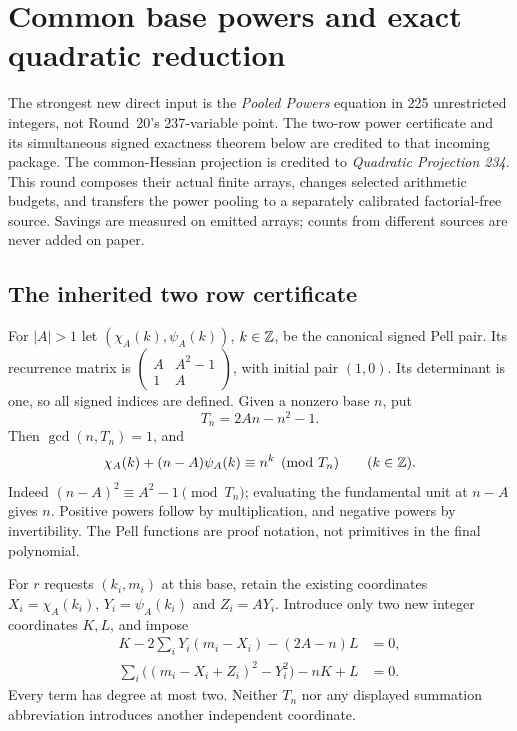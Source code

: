 \section{Common base powers and exact quadratic reduction}
\label{sec:signed}
The strongest new direct input is the \emph{Pooled Powers} equation in
225 unrestricted integers, not Round~20's 237-variable point. The two-row
power certificate and its simultaneous signed exactness theorem below
are credited to that incoming package. The common-Hessian projection
is credited to \emph{Quadratic Projection 234}. This round composes their
actual finite arrays, changes selected arithmetic budgets, and transfers
the power pooling to a separately calibrated factorial-free source.
Savings are measured on emitted arrays; counts from different sources
are never added on paper.

\subsection{The inherited two row certificate}
For $|A|>1$ let $(\chi_A(k),\psi_A(k))$, $k\in\mathbb Z$, be the canonical
signed Pell pair. Its recurrence matrix is
$\left(\begin{smallmatrix}A&A^2-1\\1&A\end{smallmatrix}\right)$,
with initial pair $(1,0)$. Its determinant is one, so all signed indices
are defined. Given a nonzero base $n$, put
\[
 T_n=2An-n^2-1.
\]
Then $\gcd(n,T_n)=1$, and
\begin{equation}\label{eq:pooled-congruence}
 \chi_A(k)+(n-A)\psi_A(k)\equiv n^k\pmod{T_n}
 \qquad(k\in\mathbb Z).
\end{equation}
Indeed $(n-A)^2\equiv A^2-1\pmod{T_n}$; evaluating the fundamental
unit at $n-A$ gives $n$. Positive powers follow by multiplication,
and negative powers by invertibility. The Pell functions are proof
notation, not primitives in the final polynomial.

For $r$ requests $(k_i,m_i)$ at this base, retain the existing coordinates
$X_i=\chi_A(k_i)$, $Y_i=\psi_A(k_i)$ and $Z_i=AY_i$.
Introduce only two new integer coordinates $K,L$, and impose
\begin{align}
 K-2\sum_iY_i(m_i-X_i)-(2A-n)L&=0,\label{eq:pool-row1}\\
 \sum_i\bigl((m_i-X_i+Z_i)^2-Y_i^2\bigr)-nK+L&=0.
 \label{eq:pool-row2}
\end{align}
Every term has degree at most two. Neither $T_n$ nor any displayed
summation abbreviation introduces another independent coordinate.

